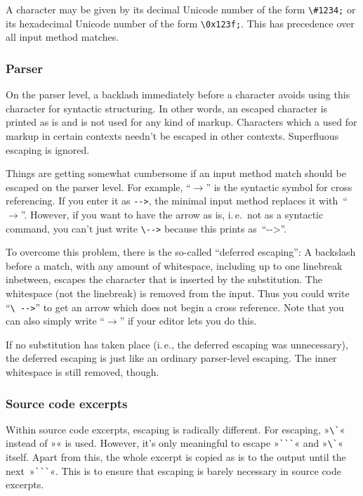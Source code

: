 \documentclass[12pt,openany]{book}
\begin{document}
A character may be given by its decimal Unicode number of the form
\verb|\#1234;| or its hexadecimal Unicode number of the form \verb|\0x123f;|.
This has precedence over all input method matches.

\subsubsection*{Parser}

On the parser level, a backlash immediately before a character avoids using
this character for syntactic structuring.  In other words, an escaped character
is printed as is and is not used for any kind of markup.  Characters which a
used for markup in certain contexts needn't be escaped in other contexts.
Superfluous escaping is ignored.

Things are getting somewhat cumbersome if an input method match should be
escaped on the parser level.  For example, ``$\rightarrow$'' is the syntactic
symbol for cross referencing.  If you enter it as \verb|-->|, the minimal input
method replaces it with~``$\rightarrow$''.  However, if you want to have the
arrow as is, i.\,e.\ not as a syntactic command, you can't just write
\verb|\-->| because this prints as~``\mbox{-{}-{}>}''.

To overcome this problem, there is the so-called ``deferred escaping'': A
backslash before a match, with any amount of whitespace, including up to one
linebreak inbetween, escapes the character that is inserted by the
substitution.  The whitespace (not the linebreak) is removed from the input.
Thus you could write ``\verb*|\ -->|'' to get an arrow which does not begin a
cross reference.  Note that you can also simply write ``$\rightarrow$''
if your editor lets you do this.

If no substitution has taken place (i.\,e., the deferred escaping was
unnecessary), the deferred escaping is just like an ordinary parser-level
escaping.  The inner whitespace is still removed, though.


\subsubsection*{Source code excerpts}

Within source code excerpts, escaping is radically different.  For escaping,
»\verb|\`|« instead of »\texttt{}« is used.  However, it's only
meaningful to escape »\verb|```|« and »\verb|\`|« itself.  Apart from this, the
whole excerpt is copied as is to the output until the next~»\verb|```|«.  This
is to ensure that escaping is barely necessary in source code excerpts.
\end{document}
